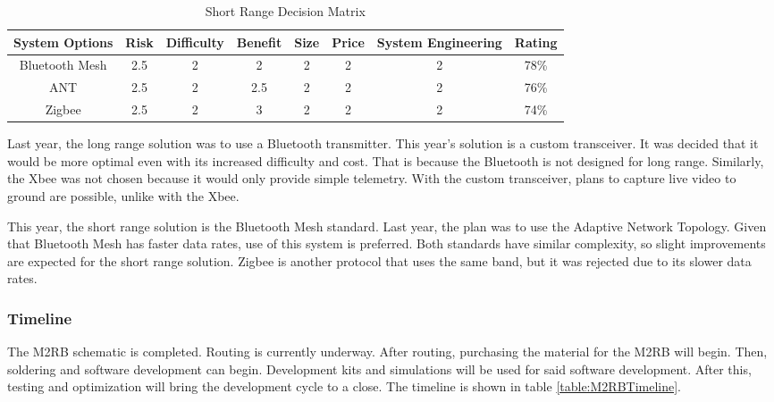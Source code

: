 \documentclass[crop=false]{standalone}
\begin{document}
        \begin{table}[H]
        \begin{center}
        \begin{tabular}{|c|c|c|c|c|c|c|c|}

        \hline
        System Options & Risk & Difficulty & Benefit & Size & Price & System Engineering & Rating\\ \hline
        Bluetooth Mesh & 2.5 & 2 & 2 & 2 & 2 & 2 & 78\% \\ \hline
        ANT & 2.5 & 2 & 2.5 & 2 & 2 & 2 & 76\% \\ \hline
        Zigbee & 2.5 & 2 & 3 & 2 & 2 & 2 & 74\% \\ \hline
        \end{tabular}
        \caption{Short Range Decision Matrix}
        \label{table:M2RBShortRangeMatrix}
        \end{center}
        \end{table}
            
            
         Last year, the long range solution was to use a Bluetooth transmitter. This year's solution is a custom transceiver. It was decided that it would be more optimal even with its increased difficulty and cost. That is because the Bluetooth is not designed for long range. Similarly, the Xbee was not chosen because it would only provide simple telemetry. With the custom transceiver, plans to capture live video to ground are possible, unlike with the Xbee.

        This year, the short range solution is the Bluetooth Mesh standard. Last year, the plan was to use the Adaptive Network Topology. Given that Bluetooth Mesh has faster data rates, use of this system is preferred. Both standards have similar complexity, so slight improvements are expected for the short range solution. Zigbee is another protocol that uses the same band, but it was rejected due to its slower data rates. 
            
    \subsubsection{Timeline}
        
        The M2RB schematic is completed. Routing is currently underway. After routing, purchasing the material for the M2RB will begin. Then, soldering and software development can begin. Development kits and simulations will be used for said software development. After this, testing and optimization will bring the development cycle to a close. The timeline is shown in table \ref{table:M2RBTimeline}.
            
\end{document}

